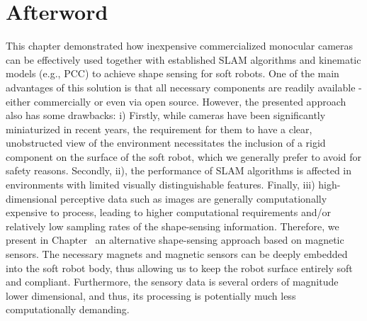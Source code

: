 \newpage







\section*{Afterword}
This chapter demonstrated how inexpensive commercialized monocular cameras can be effectively used together with established \gls{SLAM} algorithms and kinematic models (e.g., \gls{PCC}) to achieve shape sensing for soft robots. One of the main advantages of this solution is that all necessary components are readily available - either commercially or even via open source. However, the presented approach also has some drawbacks: 
i) Firstly, while cameras have been significantly miniaturized in recent years, the requirement for them to have a clear, unobstructed view of the environment necessitates the inclusion of a rigid component on the surface of the soft robot, which we generally prefer to avoid for safety reasons. 
Secondly, ii), the performance of \gls{SLAM} algorithms is affected in environments with limited visually distinguishable features.
Finally, iii) high-dimensional perceptive data such as images are generally computationally expensive to process, leading to higher computational requirements and/or relatively low sampling rates of the shape-sensing information.
Therefore, we present in Chapter~\circled{\ref{chp:promasens}} an alternative shape-sensing approach based on magnetic sensors. The necessary magnets and magnetic sensors can be deeply embedded into the soft robot body, thus allowing us to keep the robot surface entirely soft and compliant. Furthermore, the sensory data is several orders of magnitude lower dimensional, and thus, its processing is potentially much less computationally demanding.